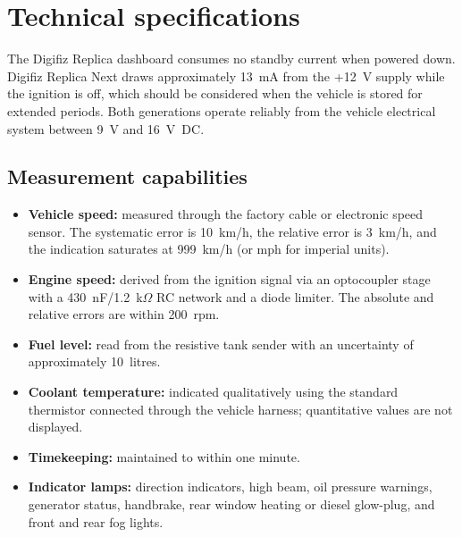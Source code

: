 \chapter{Technical specifications}\label{ch:technical-specs}

The Digifiz Replica dashboard consumes no standby current when powered down. Digifiz Replica Next draws approximately 13~mA from the +12~V supply while the ignition is off, which should be considered when the vehicle is stored for extended periods. Both generations operate reliably from the vehicle electrical system between 9~V and 16~V~DC.

\section{Measurement capabilities}
\begin{itemize}
    \item \textbf{Vehicle speed:} measured through the factory cable or electronic speed sensor. The systematic error is 10~km/h, the relative error is 3~km/h, and the indication saturates at 999~km/h (or mph for imperial units).
    \item \textbf{Engine speed:} derived from the ignition signal via an optocoupler stage with a 430~nF/1.2~k\ensuremath{\Omega} RC network and a diode limiter. The absolute and relative errors are within 200~rpm.
    \item \textbf{Fuel level:} read from the resistive tank sender with an uncertainty of approximately 10~litres.
    \item \textbf{Coolant temperature:} indicated qualitatively using the standard thermistor connected through the vehicle harness; quantitative values are not displayed.
    \item \textbf{Timekeeping:} maintained to within one minute.
    \item \textbf{Indicator lamps:} direction indicators, high beam, oil pressure warnings, generator status, handbrake, rear window heating or diesel glow-plug, and front and rear fog lights.
\end{itemize}
